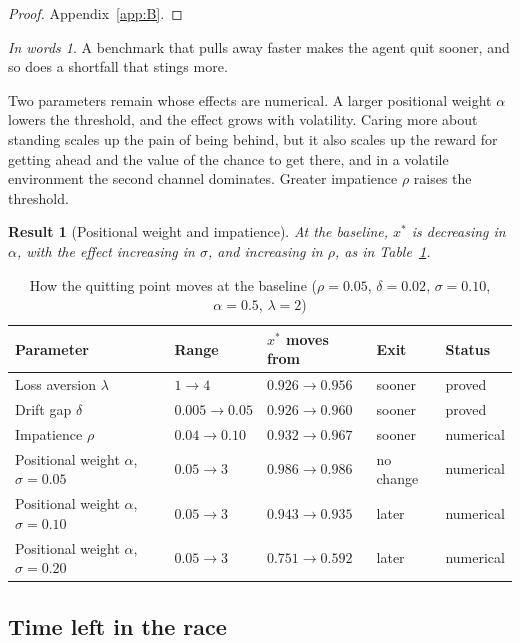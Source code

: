 \documentclass[12pt]{article}
\newtheorem{result}{Result}
\theoremstyle{definition}
\theoremstyle{remark}
\newtheorem*{inwords}{In words}
\theoremstyle{plain}
\theoremstyle{definition}
\begin{document}
\begin{proof}
Appendix~\ref{app:B}.
\end{proof}

\begin{inwords}
A benchmark that pulls away faster makes the agent quit sooner, and so does a shortfall that stings more.
\end{inwords}

Two parameters remain whose effects are numerical. A larger positional weight $\alpha$ lowers the threshold, and the effect grows with volatility. Caring more about standing scales up the pain of being behind, but it also scales up the reward for getting ahead and the value of the chance to get there, and in a volatile environment the second channel dominates. Greater impatience $\rho$ raises the threshold.

\begin{result}[Positional weight and impatience]\label{res:cs}
At the baseline, $x^*$ is decreasing in $\alpha$, with the effect increasing in $\sigma$, and increasing in $\rho$, as in Table~\ref{tab:cs}.
\end{result}

\begin{table}[t]
\centering\small
\caption{How the quitting point moves at the baseline ($\rho=0.05$, $\delta=0.02$, $\sigma=0.10$, $\alpha=0.5$, $\lambda=2$)}\label{tab:cs}
\begin{tabular}{@{}lllll@{}}
\toprule
Parameter & Range & $x^*$ moves from & Exit & Status \\
\midrule
Loss aversion $\lambda$ & $1\to4$ & $0.926\to0.956$ & sooner & proved \\
Drift gap $\delta$ & $0.005\to0.05$ & $0.926\to0.960$ & sooner & proved \\
Impatience $\rho$ & $0.04\to0.10$ & $0.932\to0.967$ & sooner & numerical \\
Positional weight $\alpha$, $\sigma=0.05$ & $0.05\to3$ & $0.986\to0.986$ & no change & numerical \\
Positional weight $\alpha$, $\sigma=0.10$ & $0.05\to3$ & $0.943\to0.935$ & later & numerical \\
Positional weight $\alpha$, $\sigma=0.20$ & $0.05\to3$ & $0.751\to0.592$ & later & numerical \\
\bottomrule
\end{tabular}
\end{table}

\subsection{Time left in the race}\label{sec:deadline}
\end{document}
